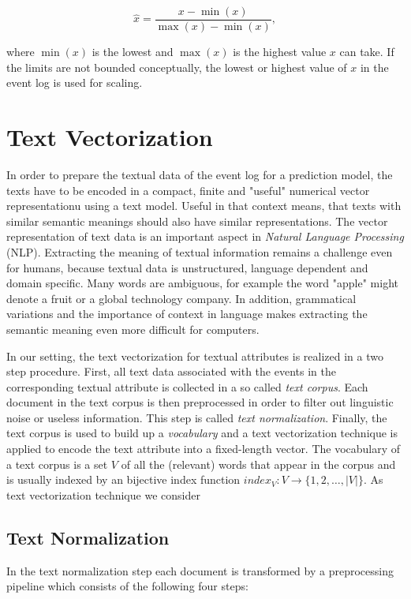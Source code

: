 $$\hat{x} = \dfrac{x-\min(x)}{\max(x) - \min(x)},$$

where $\min(x)$ is the lowest and $\max(x)$ is the highest value $x$ can take.
If the limits are not bounded conceptually, the lowest or highest value of $x$ in the event log is used for scaling.

\section{Text Vectorization}\label{sec:text}

In order to prepare the textual data of the event log for a prediction model, the texts have to be encoded in a compact, finite and "useful" numerical vector representationu using a text model.
Useful in that context means, that texts with similar semantic meanings should also have similar representations.
The vector representation of text data is an important aspect in \textit{Natural Language Processing} (NLP).
Extracting the meaning of textual information remains a challenge even for humans, because textual data is unstructured, language dependent and domain specific.
Many words are ambiguous, for example the word "apple" might denote a fruit or a global technology company.
In addition, grammatical variations and the importance of context in language makes extracting the semantic meaning even more difficult for computers.

In our setting, the text vectorization for textual attributes is realized in a two step procedure.
First, all text data associated with the events in the corresponding textual attribute is collected in a so called \textit{text corpus}.
Each document in the text corpus is then preprocessed in order to filter out linguistic noise or useless information.
This step is called \textit{text normalization}.
Finally, the text corpus is used to build up a \textit{vocabulary} and a text vectorization technique is applied to encode the text attribute into a fixed-length vector.
The vocabulary of a text corpus is a set $V$ of all the (relevant) words that appear in the corpus and is usually indexed by an bijective index function $index_V \colon V \to \{1, 2, \dots, |V|\}$.
As text vectorization technique we consider  

\subsection{Text Normalization}

In the text normalization step each document is transformed by a preprocessing pipeline which consists of the following four steps:

